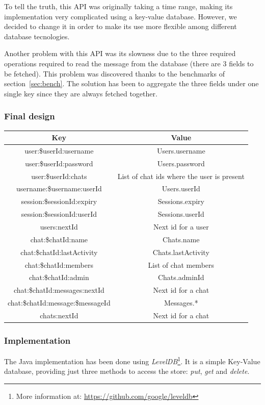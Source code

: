 \documentclass[10pt]{article}
\begin{document}
To tell the truth, this API was originally taking a time range, making its 
implementation very complicated using a key-value database. However, we 
decided to change it in order to make its use more flexible among different 
database tecnologies.

Another problem with this API was its slowness due to the three required 
operations required to read the message from the database (there are 
3 fields to be fetched). This problem was discovered thanks to the benchmarks
of section~\ref{sec:bench}. The solution has been to aggregate the three fields 
under one single key since they are always fetched together.

\subsubsection{Final design}
\begin{center}
\begin{tabular}{ | c | c | }
    \hline
    \textbf{Key} & \textbf{Value} \\\hline
    user:\$userId:username & Users.username \\\hline
    user:\$userId:password & Users.password \\\hline
    user:\$userId:chats & List of chat ids where the user is present \\\hline
    username:\$username:userId & Users.userId \\\hline
    session:\$sessionId:expiry & Sessions.expiry \\\hline
    session:\$sessionId:userId & Sessions.userId \\\hline
    users:nextId & Next id for a user \\\hline
    chat:\$chatId:name & Chats.name \\\hline
    chat:\$chatId:lastActivity & Chats.lastActivity \\\hline
    chat:\$chatId:members & List of chat members \\\hline
    chat:\$chatId:admin & Chats.adminId\\\hline
    chat:\$chatId:messages:nextId & Next id for a chat \\\hline
    chat:\$chatId:message:\$messageId & Messages.* \\\hline
    chats:nextId & Next id for a chat \\\hline
\end{tabular}
\end{center}

\subsubsection{Implementation}
The Java implementation has been done using \emph{LevelDB}\footnote{More information
at: \url{https://github.com/google/leveldb}}. It is a simple Key-Value database, 
providing just three methods to access the store: \emph{put}, \emph{get} and 
\emph{delete}.
\end{document}
